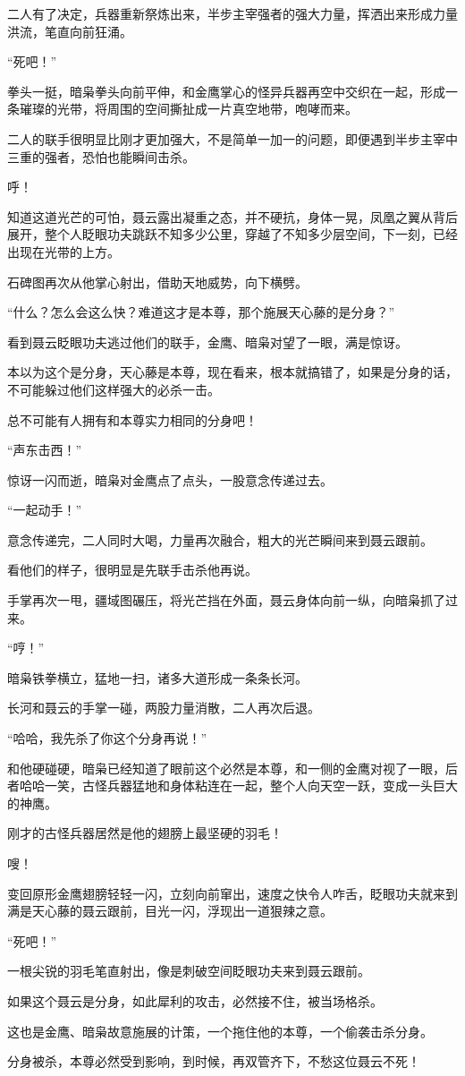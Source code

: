 \begin{this_body}
二人有了决定，兵器重新祭炼出来，半步主宰强者的强大力量，挥洒出来形成力量洪流，笔直向前狂涌。

“死吧！”

拳头一挺，暗枭拳头向前平伸，和金鹰掌心的怪异兵器再空中交织在一起，形成一条璀璨的光带，将周围的空间撕扯成一片真空地带，咆哮而来。

二人的联手很明显比刚才更加强大，不是简单一加一的问题，即便遇到半步主宰中三重的强者，恐怕也能瞬间击杀。

呼！

知道这道光芒的可怕，聂云露出凝重之态，并不硬抗，身体一晃，凤凰之翼从背后展开，整个人眨眼功夫跳跃不知多少公里，穿越了不知多少层空间，下一刻，已经出现在光带的上方。

石碑图再次从他掌心射出，借助天地威势，向下横劈。

“什么？怎么会这么快？难道这才是本尊，那个施展天心藤的是分身？”

看到聂云眨眼功夫逃过他们的联手，金鹰、暗枭对望了一眼，满是惊讶。

本以为这个是分身，天心藤是本尊，现在看来，根本就搞错了，如果是分身的话，不可能躲过他们这样强大的必杀一击。

总不可能有人拥有和本尊实力相同的分身吧！

“声东击西！”

惊讶一闪而逝，暗枭对金鹰点了点头，一股意念传递过去。

“一起动手！”

意念传递完，二人同时大喝，力量再次融合，粗大的光芒瞬间来到聂云跟前。

看他们的样子，很明显是先联手击杀他再说。

手掌再次一甩，疆域图碾压，将光芒挡在外面，聂云身体向前一纵，向暗枭抓了过来。

“哼！”

暗枭铁拳横立，猛地一扫，诸多大道形成一条条长河。

长河和聂云的手掌一碰，两股力量消散，二人再次后退。

“哈哈，我先杀了你这个分身再说！”

和他硬碰硬，暗枭已经知道了眼前这个必然是本尊，和一侧的金鹰对视了一眼，后者哈哈一笑，古怪兵器猛地和身体粘连在一起，整个人向天空一跃，变成一头巨大的神鹰。

刚才的古怪兵器居然是他的翅膀上最坚硬的羽毛！

嗖！

变回原形金鹰翅膀轻轻一闪，立刻向前窜出，速度之快令人咋舌，眨眼功夫就来到满是天心藤的聂云跟前，目光一闪，浮现出一道狠辣之意。

“死吧！”

一根尖锐的羽毛笔直射出，像是刺破空间眨眼功夫来到聂云跟前。

如果这个聂云是分身，如此犀利的攻击，必然接不住，被当场格杀。

这也是金鹰、暗枭故意施展的计策，一个拖住他的本尊，一个偷袭击杀分身。

分身被杀，本尊必然受到影响，到时候，再双管齐下，不愁这位聂云不死！

\end{this_body}

